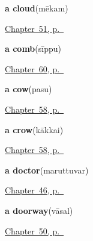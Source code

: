 \noindent\begin{minipage}[t]{\linewidth}
\raggedright
\textbf{a cloud}\enspace\emph{}\enspace(mēkam)\par
\footnotesize \hyperref[ch:ta-overhead]{Chapter~51, p.~\pageref*{ch:ta-overhead}}
\end{minipage}\par\smallskip

\noindent\begin{minipage}[t]{\linewidth}
\raggedright
\textbf{a comb}\enspace\emph{}\enspace(sīppu)\par
\footnotesize \hyperref[ch:ta-things-people-make]{Chapter~60, p.~\pageref*{ch:ta-things-people-make}}
\end{minipage}\par\smallskip

\noindent\begin{minipage}[t]{\linewidth}
\raggedright
\textbf{a cow}\enspace\emph{}\enspace(pasu)\par
\footnotesize \hyperref[ch:ta-around-the-yard]{Chapter~58, p.~\pageref*{ch:ta-around-the-yard}}
\end{minipage}\par\smallskip

\noindent\begin{minipage}[t]{\linewidth}
\raggedright
\textbf{a crow}\enspace\emph{}\enspace(kākkai)\par
\footnotesize \hyperref[ch:ta-around-the-yard]{Chapter~58, p.~\pageref*{ch:ta-around-the-yard}}
\end{minipage}\par\smallskip

\noindent\begin{minipage}[t]{\linewidth}
\raggedright
\textbf{a doctor}\enspace\emph{}\enspace(maruttuvar)\par
\footnotesize \hyperref[ch:ta-roles]{Chapter~46, p.~\pageref*{ch:ta-roles}}
\end{minipage}\par\smallskip

\noindent\begin{minipage}[t]{\linewidth}
\raggedright
\textbf{a doorway}\enspace\emph{}\enspace(vāsal)\par
\footnotesize \hyperref[ch:ta-at-the-doorway]{Chapter~50, p.~\pageref*{ch:ta-at-the-doorway}}
\end{minipage}\par\smallskip

